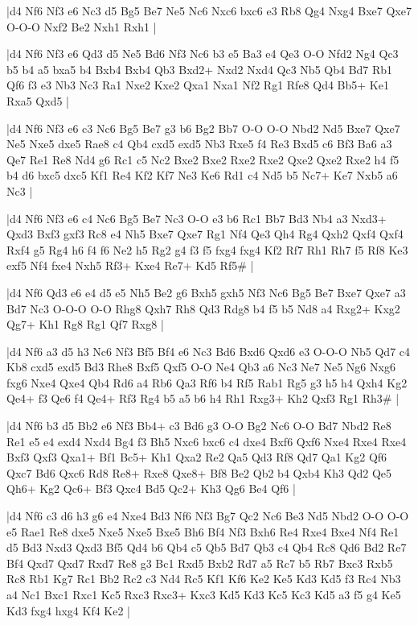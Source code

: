 \whitename{}
\blackname{}
\makegametitle
|d4 Nf6 Nf3 e6 Nc3 d5 Bg5 Be7 Ne5 Nc6 Nxc6 bxc6 e3 Rb8 Qg4 Nxg4 Bxe7 Qxe7 O-O-O Nxf2 Be2 Nxh1 Rxh1  |

\whitename{}
\blackname{}
\makegametitle
|d4 Nf6 Nf3 e6 Qd3 d5 Ne5 Bd6 Nf3 Nc6 b3 e5 Ba3 e4 Qe3 O-O Nfd2 Ng4 Qc3 b5 b4 a5 bxa5 b4 Bxb4 Bxb4 Qb3 Bxd2+ Nxd2 Nxd4 Qc3 Nb5 Qb4 Bd7 Rb1 Qf6 f3 e3 Nb3 Nc3 Ra1 Nxe2 Kxe2 Qxa1 Nxa1 Nf2 Rg1 Rfe8 Qd4 Bb5+ Ke1 Rxa5 Qxd5  |

\whitename{}
\blackname{}
\makegametitle
|d4 Nf6 Nf3 e6 c3 Nc6 Bg5 Be7 g3 b6 Bg2 Bb7 O-O O-O Nbd2 Nd5 Bxe7 Qxe7 Ne5 Nxe5 dxe5 Rae8 c4 Qb4 cxd5 exd5 Nb3 Rxe5 f4 Re3 Bxd5 c6 Bf3 Ba6 a3 Qe7 Re1 Re8 Nd4 g6 Rc1 c5 Nc2 Bxe2 Bxe2 Rxe2 Rxe2 Qxe2 Qxe2 Rxe2 h4 f5 b4 d6 bxc5 dxc5 Kf1 Re4 Kf2 Kf7 Ne3 Ke6 Rd1 c4 Nd5 b5 Nc7+ Ke7 Nxb5 a6 Nc3  |

\whitename{}
\blackname{}
\makegametitle
|d4 Nf6 Nf3 e6 c4 Nc6 Bg5 Be7 Nc3 O-O e3 b6 Rc1 Bb7 Bd3 Nb4 a3 Nxd3+ Qxd3 Bxf3 gxf3 Rc8 e4 Nh5 Bxe7 Qxe7 Rg1 Nf4 Qe3 Qh4 Rg4 Qxh2 Qxf4 Qxf4 Rxf4 g5 Rg4 h6 f4 f6 Ne2 h5 Rg2 g4 f3 f5 fxg4 fxg4 Kf2 Rf7 Rh1 Rh7 f5 Rf8 Ke3 exf5 Nf4 fxe4 Nxh5 Rf3+ Kxe4 Re7+ Kd5 Rf5\#  |

\whitename{}
\blackname{}
\makegametitle
|d4 Nf6 Qd3 e6 e4 d5 e5 Nh5 Be2 g6 Bxh5 gxh5 Nf3 Nc6 Bg5 Be7 Bxe7 Qxe7 a3 Bd7 Nc3 O-O-O O-O Rhg8 Qxh7 Rh8 Qd3 Rdg8 b4 f5 b5 Nd8 a4 Rxg2+ Kxg2 Qg7+ Kh1 Rg8 Rg1 Qf7 Rxg8  |

\whitename{}
\blackname{}
\makegametitle
|d4 Nf6 a3 d5 h3 Nc6 Nf3 Bf5 Bf4 e6 Nc3 Bd6 Bxd6 Qxd6 e3 O-O-O Nb5 Qd7 c4 Kb8 cxd5 exd5 Bd3 Rhe8 Bxf5 Qxf5 O-O Ne4 Qb3 a6 Nc3 Ne7 Ne5 Ng6 Nxg6 fxg6 Nxe4 Qxe4 Qb4 Rd6 a4 Rb6 Qa3 Rf6 b4 Rf5 Rab1 Rg5 g3 h5 h4 Qxh4 Kg2 Qe4+ f3 Qe6 f4 Qe4+ Rf3 Rg4 b5 a5 b6 h4 Rh1 Rxg3+ Kh2 Qxf3 Rg1 Rh3\#  |

\whitename{}
\blackname{}
\makegametitle
|d4 Nf6 b3 d5 Bb2 e6 Nf3 Bb4+ c3 Bd6 g3 O-O Bg2 Nc6 O-O Bd7 Nbd2 Re8 Re1 e5 e4 exd4 Nxd4 Bg4 f3 Bh5 Nxc6 bxc6 c4 dxe4 Bxf6 Qxf6 Nxe4 Rxe4 Rxe4 Bxf3 Qxf3 Qxa1+ Bf1 Bc5+ Kh1 Qxa2 Re2 Qa5 Qd3 Rf8 Qd7 Qa1 Kg2 Qf6 Qxc7 Bd6 Qxc6 Rd8 Re8+ Rxe8 Qxe8+ Bf8 Be2 Qb2 b4 Qxb4 Kh3 Qd2 Qe5 Qh6+ Kg2 Qc6+ Bf3 Qxc4 Bd5 Qc2+ Kh3 Qg6 Be4 Qf6  |

\whitename{}
\blackname{}
\makegametitle
|d4 Nf6 c3 d6 h3 g6 e4 Nxe4 Bd3 Nf6 Nf3 Bg7 Qc2 Nc6 Be3 Nd5 Nbd2 O-O O-O e5 Rae1 Re8 dxe5 Nxe5 Nxe5 Bxe5 Bh6 Bf4 Nf3 Bxh6 Re4 Rxe4 Bxe4 Nf4 Re1 d5 Bd3 Nxd3 Qxd3 Bf5 Qd4 b6 Qb4 c5 Qb5 Bd7 Qb3 c4 Qb4 Rc8 Qd6 Bd2 Re7 Bf4 Qxd7 Qxd7 Rxd7 Re8 g3 Bc1 Rxd5 Bxb2 Rd7 a5 Rc7 b5 Rb7 Bxc3 Rxb5 Rc8 Rb1 Kg7 Rc1 Bb2 Rc2 c3 Nd4 Rc5 Kf1 Kf6 Ke2 Ke5 Kd3 Kd5 f3 Rc4 Nb3 a4 Nc1 Bxc1 Rxc1 Kc5 Rxc3 Rxc3+ Kxc3 Kd5 Kd3 Kc5 Kc3 Kd5 a3 f5 g4 Ke5 Kd3 fxg4 hxg4 Kf4 Ke2  |

